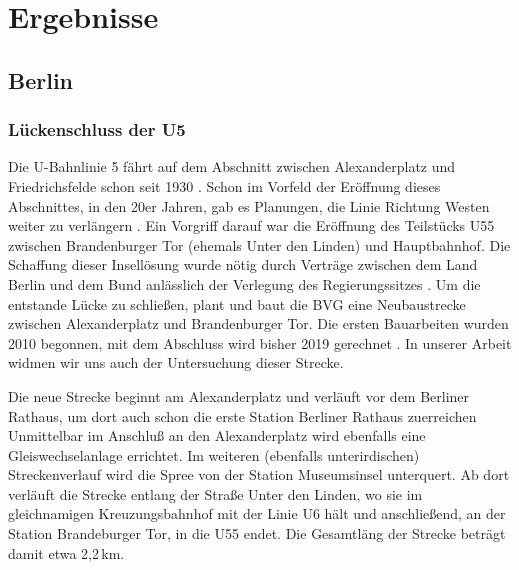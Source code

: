 \chapter{Ergebnisse}

\begin{comment}

Gliederung meiner Streckenbeschreibung (Yves)

* Übersicht
  * Umfeld des Bauprojekts
  * von wo nach wo
  * historische Einordnung

* konkrter Streckenverlauf
* detalierte Daten (weichen etc ..)


* Probleme
  * bautechnisch
  * gesellschaftlich

* Zeitplan

* Kosten
\end{comment}



\section{Berlin}
\subsection*{Lückenschluss der U5}

Die U-Bahnlinie 5 fährt auf dem Abschnitt zwischen Alexanderplatz und
Friedrichsfelde schon seit 1930 \cite{bkhU5}. Schon im Vorfeld der Eröffnung
dieses Abschnittes, in den 20er Jahren, gab es Planungen, die Linie Richtung
Westen weiter zu verlängern \cite{bvgWebsiteU5}. Ein Vorgriff darauf war die
Eröffnung des Teilstücks U55 zwischen Brandenburger Tor (ehemals Unter den
Linden) und Hauptbahnhof. Die Schaffung dieser Insellösung wurde nötig durch
Verträge zwischen dem Land Berlin und dem Bund anlässlich der Verlegung des
Regierungssitzes \cite{hauptstadtvertrag}. Um die entstande Lücke zu schließen,
plant und baut die BVG eine Neubaustrecke zwischen Alexanderplatz und
Brandenburger Tor. Die ersten Bauarbeiten wurden 2010 begonnen, mit dem
Abschluss wird bisher 2019 gerechnet \cite{bvgWebsiteU5plan}. In unserer Arbeit
widmen wir uns auch der Untersuchung dieser Strecke.

Die neue Strecke beginnt am Alexanderplatz und verläuft vor dem Berliner
Rathaus, um dort auch schon die erste Station Berliner Rathaus zuerreichen
\cite{bkhU5} \cite{bvgWebsiteU5} Unmittelbar im Anschluß an den Alexanderplatz
wird ebenfalls eine Gleiswechselanlage errichtet. Im weiteren (ebenfalls
unterirdischen) Streckenverlauf wird die Spree von der Station Museumsinsel
unterquert. Ab dort verläuft die Strecke entlang der Straße Unter den Linden, wo
sie im gleichnamigen Kreuzungsbahnhof mit der Linie U6 hält und anschließend, an
der Station Brandeburger Tor, in die U55 endet. Die Gesamtläng der Strecke
beträgt damit etwa 2,2\,km.

